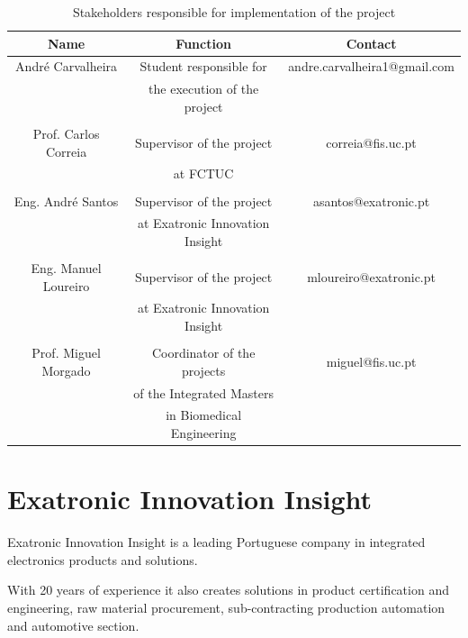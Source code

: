 % 
\begin{table}[h]
\begin{tabular}{@{}ccc@{}}
\toprule
Name&Function& Contact \\ \midrule

 André Carvalheira & Student responsible for & andre.carvalheira1@gmail.com \\
&the execution of the project&\\ \\

Prof. Carlos Correia & Supervisor of the project & correia@fis.uc.pt            \\
&at FCTUC&\\ \\

Eng. André Santos & Supervisor of the project & asantos@exatronic.pt     \\
&at Exatronic Innovation Insight  &\\ \\

Eng. Manuel Loureiro & Supervisor of the project   & mloureiro@exatronic.pt       \\ 
&at Exatronic Innovation Insight&\\ \\

Prof. Miguel Morgado & Coordinator of the projects   & miguel@fis.uc.pt \\
&of the Integrated Masters& \\ 
&in Biomedical Engineering&\\  \midrule
           
\end{tabular}
\caption[Stakeholders]{Stakeholders responsible for implementation of the project}
\label{tab:Team}
\end{table}


\section{Exatronic Innovation Insight}

Exatronic Innovation Insight is a leading Portuguese company in integrated electronics products and solutions.

With 20 years of experience it also creates solutions in product certification and engineering, raw material procurement, sub-contracting production automation and automotive section.

